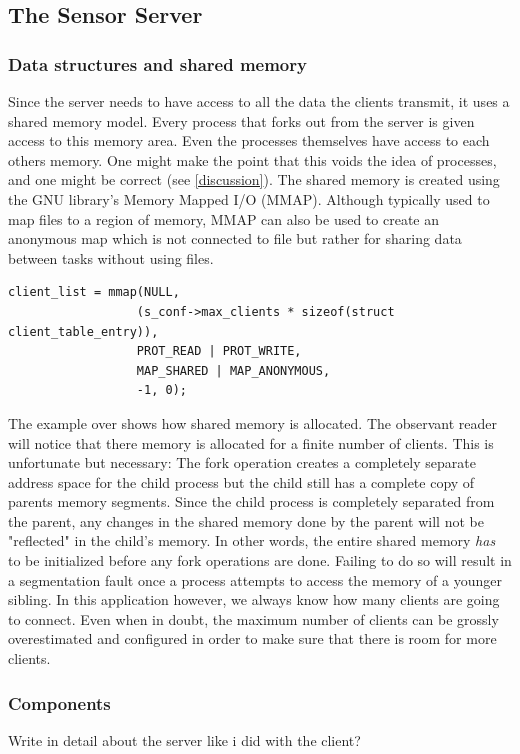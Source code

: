 \documentclass[12pt,english,a4paper]{report}
\begin{document}
\subsection{The Sensor Server }

\subsubsection{Data structures and shared memory}
Since the server needs to have access to all the data the clients transmit, it uses a shared memory model. Every process that forks out from the server is given access to this memory area. Even the processes themselves have access to each others memory. One might make the point that this voids the idea of processes, and one might be correct (see \ref{discussion}). The shared memory is created using the GNU library's Memory Mapped I/O (MMAP). Although typically used to map files to a region of memory, MMAP can also be used to create an anonymous map which is not connected to file but rather for sharing data between tasks without using files.

\begin{lstlisting}
client_list = mmap(NULL, 
                  (s_conf->max_clients * sizeof(struct client_table_entry)), 
                  PROT_READ | PROT_WRITE,
                  MAP_SHARED | MAP_ANONYMOUS,
                  -1, 0);
\end{lstlisting}
The example over shows how shared memory is allocated. The observant reader will notice that there memory is allocated for a finite number of clients. This is unfortunate but necessary: The fork operation creates a completely separate address space for the child process but the child still has a complete copy of parents memory segments. Since the child process is completely separated from the parent, any changes in the shared memory done by the parent will not be "reflected" in the child's memory. In other words, the entire shared memory \textit{has} to be initialized before any fork operations are done. Failing to do so will result in a segmentation fault once a process attempts to access the memory of a younger sibling. In this application however, we always know how many clients are going to connect. Even when in doubt, the maximum number of clients can be grossly overestimated and configured in order to make sure that there is room for more clients.

\subsubsection{Components}
Write in detail about the server like i did with the client?
\end{document}
